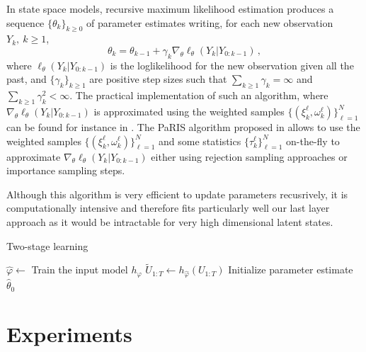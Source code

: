 \documentclass[conference]{IEEEtran}
\begin{document}
In state space models, recursive maximum likelihood estimation produces a sequence $\lbrace\theta_k\rbrace_{k\geq 0}$ of parameter estimates writing, for each new observation $Y_{k},~k\geq 1$,
$$
	\theta_{k} = \theta_{k-1} + \gamma_k \nabla_\theta \ell_{\theta}(Y_k | Y_{0:k - 1}) \,,
$$
where $\ell_{\theta}(Y_k | Y_{0:k - 1})$ is the loglikelihood for the new observation given all the past, and $\lbrace\gamma_k\rbrace_{k\geq 1}$ are positive step sizes such that $\sum_{k \geq 1}\gamma_k = \infty$ and $\sum_{k \geq 1}\gamma_k^2 < \infty$. The practical implementation of such an algorithm, where $\nabla_\theta\ell_{\theta}(Y_k | Y_{0:k - 1})$ is approximated using the weighted samples $\{(\xi^{\ell}_k,\omega^{\ell}_k)\}_{\ell=1}^N$ can be found for instance in \cite{gloaguen2022pseudo}. The PaRIS algorithm proposed in \cite{Olsson2014EfficientPO} allows to use the weighted samples $\{(\xi^{\ell}_k,\omega^{\ell}_k)\}_{\ell=1}^N$ and some statistics $\{\tau^{\ell}_k\}_{\ell=1}^N$ on-the-fly to approximate $\nabla_\theta \ell_{\theta}(Y_k | Y_{0:k - 1})$ either using rejection sampling approaches or importance sampling steps.

Although this algorithm is very efficient to update parameters recusrively, it is computationally intensive and therefore fits particularly well our last layer approach as it would be intractable for very high dimensional latent states.

\begin{algorithm}
	\caption{Two-stage learning}
	\label{alg:particle_filter}
	\KwOut{$(\hat \varphi, \hat \theta)$}
	$\hat \varphi \gets$ Train the input model $h_\varphi$\;
	$\widetilde U_{1:T} \gets h_{\hat \varphi}(U_{1:T})$\;
	Initialize parameter estimate $\widehat \theta_0$\;

\end{algorithm}

\section{Experiments}
\label{sec:exp}
\end{document}
